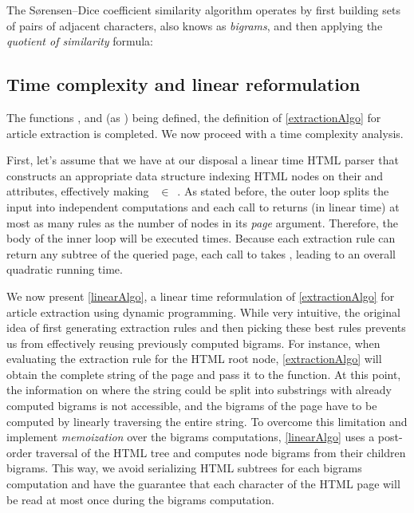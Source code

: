 The Sørensen–Dice coefficient similarity algorithm operates by first building sets of pairs of adjacent characters, also knows as \emph{bigrams}, and then applying the \emph{quotient of similarity} formula:

\similarityAlgo


\subsection{Time complexity and linear reformulation}
\label{timecomplexityandlinearreformulation}

The functions ,  and  (as ) being defined, the definition of \autoref{extractionAlgo} for article extraction is completed. We now proceed with a time complexity analysis.

First, let's assume that we have at our disposal a linear time HTML parser that constructs an appropriate data structure indexing HTML nodes on their  and  attributes, effectively making ~$\in$~. As stated before, the outer loop splits the input into independent computations and each call to  returns (in linear time) at most as many rules as the number of nodes in its \emph{page} argument. Therefore, the body of the inner loop will be executed  times. Because each extraction rule can return any subtree of the queried page, each call to  takes , leading to an overall quadratic running time.

We now present \autoref{linearAlgo}, a linear time reformulation of \autoref{extractionAlgo} for article extraction using dynamic programming. While very intuitive, the original idea of first generating extraction rules and then picking these best rules prevents us from effectively reusing previously computed bigrams. For instance, when evaluating the extraction rule for the HTML root node, \autoref{extractionAlgo} will obtain the complete string of the page and pass it to the  function. At this point, the information on where the string could be split into substrings with already computed bigrams is not accessible, and the bigrams of the page have to be computed by linearly traversing the entire string. To overcome this limitation and implement \emph{memoization} over the bigrams computations, \autoref{linearAlgo} uses a post-order traversal of the HTML tree and computes node bigrams from their children bigrams. This way, we avoid serializing HTML subtrees for each bigrams computation and have the guarantee that each character of the HTML page will be read at most once during the bigrams computation.


